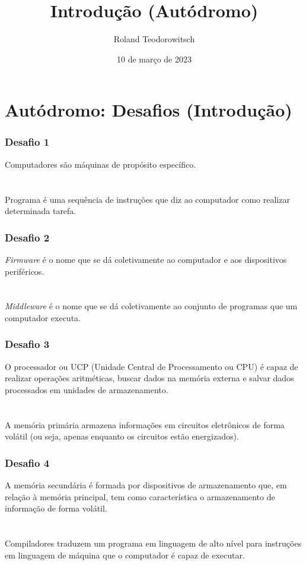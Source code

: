 \documentclass[aspectratio=169]{beamer}
\title[\sc{Introdução (Autódromo)}]{Introdução (Autódromo)}
\author[Roland Teodorowitsch]{Roland Teodorowitsch}
\institute[FPROG - EP - PUCRS]{Fundamentos de Programação - Escola Politécnica - PUCRS}
\date{10 de março de 2023}
\begin{document}
\justifying

\begin{frame}
	\titlepage
\end{frame}

\section{Autódromo: Desafios (Introdução)}

\begin{frame}\frametitle{Desafio 1}
Computadores são máquinas de propósito específico.\\
~\\
~\\
Programa é uma sequência de instruções que diz ao computador como realizar determinada tarefa.
\end{frame}

\begin{frame}\frametitle{Desafio 2}
\emph{Firmware} é o nome que se dá coletivamente ao computador e aos dispositivos periféricos.\\
~\\
~\\
\emph{Middleware} é o nome que se dá coletivamente ao conjunto de programas que um computador executa.
\end{frame}

\begin{frame}\frametitle{Desafio 3}
O processador ou UCP (Unidade Central de Processamento ou CPU) é capaz de realizar operações aritméticas, buscar dados na memória externa e salvar dados processados em unidades de armazenamento.\\
~\\
~\\
A memória primária armazena informações em circuitos eletrônicos de forma volátil (ou seja, apenas enquanto os circuitos estão energizados).
\end{frame}

\begin{frame}\frametitle{Desafio 4}
A memória secundária é formada por dispositivos de armazenamento que, em relação à memória principal, tem como característica o armazenamento de informação de forma volátil.\\
~\\
~\\
Compiladores traduzem um programa em linguagem de alto nível para instruções em linguagem de máquina que o computador é capaz de executar.
\end{frame}
\end{document}
